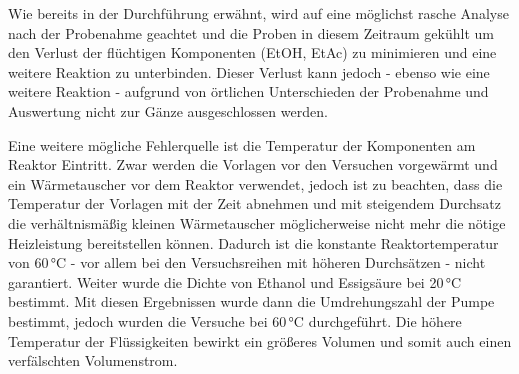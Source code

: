 \documentclass[12pt,liststotoc]{report}
\begin{document}
Wie bereits in der Durchführung erwähnt, wird auf eine möglichst rasche Analyse nach der Probenahme geachtet und die Proben in diesem Zeitraum gekühlt um den Verlust der flüchtigen Komponenten (EtOH, EtAc) zu minimieren und eine weitere Reaktion zu unterbinden. Dieser Verlust kann jedoch - ebenso wie eine weitere Reaktion - aufgrund von örtlichen Unterschieden der Probenahme und Auswertung nicht zur Gänze ausgeschlossen werden.

Eine weitere mögliche Fehlerquelle ist die Temperatur der Komponenten am Reaktor Eintritt. Zwar werden die Vorlagen vor den Versuchen vorgewärmt und ein Wärmetauscher vor dem Reaktor verwendet, jedoch ist zu beachten, dass die Temperatur der Vorlagen mit der Zeit abnehmen und mit steigendem Durchsatz die verhältnismäßig kleinen Wärmetauscher möglicherweise nicht mehr die nötige Heizleistung bereitstellen können. Dadurch ist die konstante Reaktortemperatur von 60\,$\text{°C}$ - vor allem bei den Versuchsreihen mit höheren Durchsätzen - nicht garantiert. Weiter wurde die Dichte von Ethanol und Essigsäure bei 20\,°C bestimmt. Mit diesen Ergebnissen wurde dann die Umdrehungszahl der Pumpe bestimmt, jedoch wurden die Versuche bei 60\,°C durchgeführt. Die höhere Temperatur der Flüssigkeiten bewirkt ein größeres Volumen und somit auch einen verfälschten Volumenstrom.
\end{document}
